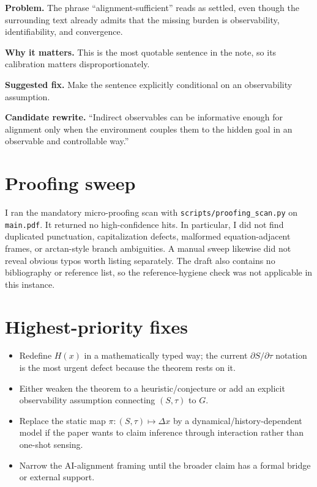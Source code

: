\documentclass[11pt]{article}
\begin{document}
\textbf{Problem.} The phrase ``alignment-sufficient'' reads as settled, even though the surrounding text already admits that the missing burden is observability, identifiability, and convergence.

\textbf{Why it matters.} This is the most quotable sentence in the note, so its calibration matters disproportionately.

\textbf{Suggested fix.} Make the sentence explicitly conditional on an observability assumption.

\textbf{Candidate rewrite.} ``Indirect observables can be informative enough for alignment only when the environment couples them to the hidden goal in an observable and controllable way.''

\section*{Proofing sweep}

I ran the mandatory micro-proofing scan with \texttt{scripts/proofing\_scan.py} on \texttt{main.pdf}. It returned no high-confidence hits. In particular, I did not find duplicated punctuation, capitalization defects, malformed equation-adjacent frames, or arctan-style branch ambiguities. A manual sweep likewise did not reveal obvious typos worth listing separately. The draft also contains no bibliography or reference list, so the reference-hygiene check was not applicable in this instance.

\section*{Highest-priority fixes}

\begin{itemize}
    \item Redefine $H(x)$ in a mathematically typed way; the current $\partial S / \partial \tau$ notation is the most urgent defect because the theorem rests on it.
    \item Either weaken the theorem to a heuristic/conjecture or add an explicit observability assumption connecting $(S,\tau)$ to $G$.
    \item Replace the static map $\pi:(S,\tau)\mapsto \Delta x$ by a dynamical/history-dependent model if the paper wants to claim inference through interaction rather than one-shot sensing.
    \item Narrow the AI-alignment framing until the broader claim has a formal bridge or external support.
\end{itemize}
\end{document}
